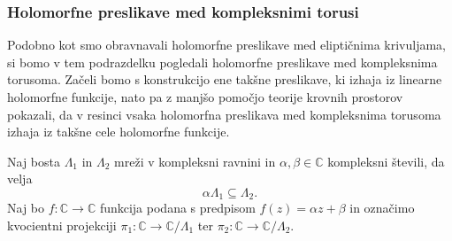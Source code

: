 \documentclass[mat1]{fmfdelo}
\numberwithin{equation}{section}
\newcommand{\C}{\mathbb C}
\theoremstyle{definition}
\begin{document}
\subsubsection{Holomorfne preslikave med kompleksnimi torusi}

Podobno kot smo obravnavali holomorfne preslikave med eliptičnima krivuljama, si bomo v tem podrazdelku pogledali holomorfne preslikave med kompleksnima torusoma. Začeli bomo s konstrukcijo ene takšne preslikave, ki izhaja iz linearne holomorfne funkcije, nato pa z manjšo pomočjo teorije krovnih prostorov pokazali, da v resinci vsaka holomorfna preslikava med kompleksnima torusoma izhaja iz takšne cele holomorfne funkcije. 

\begin{zgled*}
    \label{afina transformacija C inducira holomorfno preslikavo torusov}
    Naj bosta $\Lambda_1$ in $\Lambda_2$ mreži v kompleksni ravnini in $\alpha,\beta \in \C$ kompleksni števili, da velja
    \[
        \alpha\Lambda_1 \subseteq \Lambda_2.
    \]
    Naj bo $f : \C \to \C$ funkcija podana s predpisom $f(z) = \alpha z + \beta$ in označimo kvocientni projekciji $\pi_1 : \C \to \C/\Lambda_1$ ter $\pi_2 : \C \to \C/\Lambda_2$. 


\end{zgled*}
\end{document}
